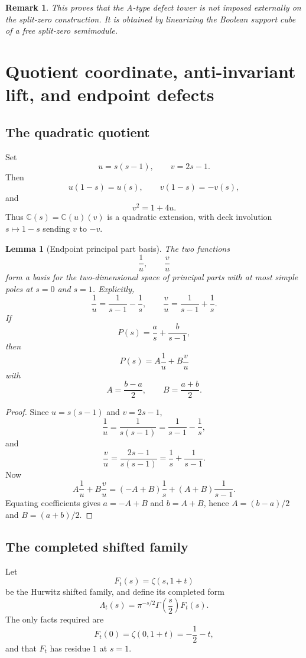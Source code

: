 \documentclass[11pt]{amsart}
\newtheorem{lemma}[theorem]{Lemma}
\newtheorem{remark}[theorem]{Remark}
\newcommand{\CC}{\mathbb C}
\begin{document}
\begin{remark}
This proves that the A-type defect tower is not imposed externally on the split-zero construction.  It is obtained by linearizing the Boolean support cube of a free split-zero semimodule.
\end{remark}

\section{Quotient coordinate, anti-invariant lift, and endpoint defects}

\subsection{The quadratic quotient}

Set
\[
       u=s(s-1),
       \qquad
       v=2s-1.
\]
Then
\[
       u(1-s)=u(s),
       \qquad
       v(1-s)=-v(s),
\]
and
\[
       v^2=1+4u.
\]
Thus $\CC(s)=\CC(u)(v)$ is a quadratic extension, with deck involution $s\mapsto1-s$ sending $v$ to $-v$.

\begin{lemma}[Endpoint principal part basis]
The two functions
\[
       \frac1u,
       \qquad
       \frac vu
\]
form a basis for the two-dimensional space of principal parts with at most simple poles at $s=0$ and $s=1$.  Explicitly,
\[
       \frac1u=\frac1{s-1}-\frac1s,
       \qquad
       \frac vu=\frac1{s-1}+\frac1s.
\]
If
\[
       P(s)=\frac a s+\frac b{s-1},
\]
then
\[
       P(s)=A\frac1u+B\frac vu
\]
with
\[
       A=\frac{b-a}{2},
       \qquad
       B=\frac{a+b}{2}.
\]
\end{lemma}

\begin{proof}
Since $u=s(s-1)$ and $v=2s-1$,
\[
      \frac1u=\frac1{s(s-1)}=\frac1{s-1}-\frac1s,
\]
and
\[
      \frac vu=\frac{2s-1}{s(s-1)}=\frac1s+\frac1{s-1}.
\]
Now
\[
      A\frac1u+B\frac vu
      =(-A+B)\frac1s+(A+B)\frac1{s-1}.
\]
Equating coefficients gives $a=-A+B$ and $b=A+B$, hence $A=(b-a)/2$ and $B=(a+b)/2$.\end{proof}

\subsection{The completed shifted family}

Let
\[
      F_t(s)=\zeta(s,1+t)
\]
be the Hurwitz shifted family, and define its completed form
\[
      \Lambda_t(s)=\pi^{-s/2}\Gamma\left(\frac s2\right)F_t(s).
\]
The only facts required are
\[
      F_t(0)=\zeta(0,1+t)=-\frac12-t,
\]
and that $F_t$ has residue $1$ at $s=1$.
\end{document}
